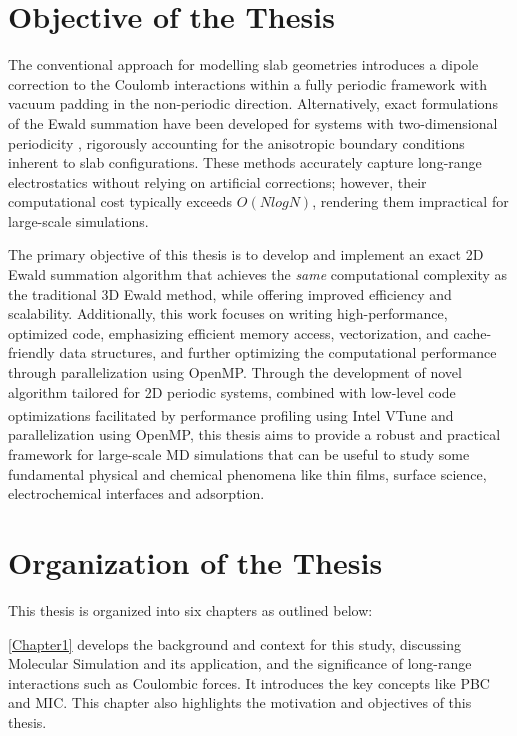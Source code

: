 \section{Objective of the Thesis}
The conventional approach for modelling slab geometries introduces a dipole correction \cite{dipole-yeh-berkowitz} to the Coulomb interactions within a fully periodic framework with vacuum padding in the non-periodic direction. Alternatively, exact formulations of the Ewald summation have been developed for systems with two-dimensional periodicity \cite{kawata, PARRY1975433,de1979electrostatic, Heyes19771485}, rigorously accounting for the anisotropic boundary conditions inherent to slab configurations. These methods accurately capture long-range electrostatics without relying on artificial corrections; however, their computational cost typically exceeds $O(NlogN)$, rendering them impractical for large-scale simulations.

The primary objective of this thesis is to develop and implement an exact 2D Ewald summation algorithm that achieves the \emph{same} computational complexity as the traditional 3D Ewald method, while offering improved efficiency and scalability. Additionally, this work focuses on writing high-performance, optimized code, emphasizing efficient memory access, vectorization, and cache-friendly data structures, and further optimizing the computational performance through parallelization using OpenMP. Through the development of novel algorithm tailored for 2D periodic systems, combined with low-level code optimizations facilitated by performance profiling using Intel\textsuperscript{\textregistered} VTune and parallelization using OpenMP, this thesis aims to provide a robust and practical framework for large-scale \acs{MD} simulations that can be useful to study some fundamental physical and chemical phenomena like thin films, surface science,  electrochemical interfaces and adsorption.

\section{Organization of the Thesis}
This thesis is organized into six chapters as outlined below:

\autoref{Chapter1} develops the background and context for this study, discussing Molecular Simulation and its application, and the significance of long-range interactions such as Coulombic forces. It introduces the key concepts like \ac{PBC} and \ac{MIC}. This chapter also highlights the motivation and objectives of this thesis.

